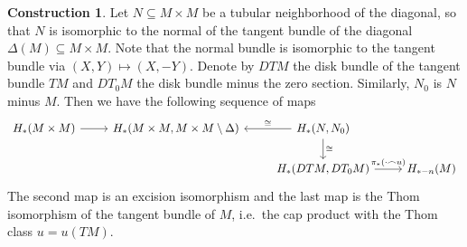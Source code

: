\documentclass{scrartcl}
\theoremstyle{plain}
\theoremstyle{definition}
\newtheorem{construction}[theorem]{Construction}
\renewcommand{\subset}{\subseteq}
\newcommand{\capp}{\mathbin{\frown}}
\newcommand{\iso}{\cong}
\begin{document}
\begin{construction}\label{constr:isect-via-tubular}
Let $N\subset M\times M$ be a tubular neighborhood of the diagonal, so that $N$ is isomorphic to the normal of the tangent bundle of the diagonal $\Delta(M)\subset M\times M$. Note that the normal bundle is isomorphic to the tangent bundle via $(X, Y)\mapsto (X, -Y)$. Denote by $DTM$ the disk bundle of the tangent bundle $TM$ and $DT_0M$ the disk bundle minus the zero section. Similarly, $N_0$ is $N$ minus $M$. Then we have the following sequence of maps
\begin{equation}
\begin{tikzcd}
    H_*(M\times M) \rar & H_*(M\times M, M\times M\setminus \Delta) & \lar[swap, "\iso"] H_*(N, N_0) \dar["\iso"] &\ \\
    & & H_*(DTM, DT_0M) \rar["\pi_*(\cdot \capp u)"] & H_{*-n}(M)
\end{tikzcd}
\end{equation}
The second map is an excision isomorphism and the last map is the Thom isomorphism of the tangent bundle of $M$, i.e.\ the cap product with the Thom class $u=u(TM)$. 
\end{construction}
\end{document}
